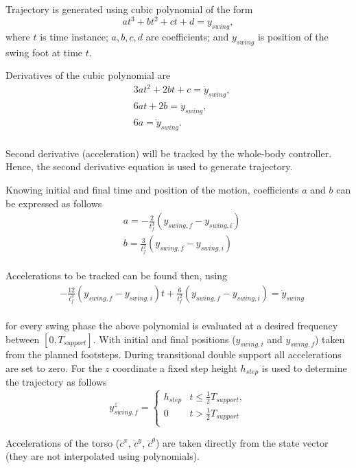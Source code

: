 \documentclass[a4paper]{article}
\begin{document}
Trajectory is generated using cubic polynomial of the form
\begin{equation}
    at^3 + bt^2 + ct + d = y_{swing},
\end{equation}
where $t$ is time instance; $a,b,c,d$ are coefficients; and $y_{swing}$ is position of the swing
foot at time $t$.

\noindent Derivatives of the cubic polynomial are
\begin{equation}
\begin{split}
    & 3at^2 + 2bt + c = \dot{y}_{swing},\\
    & 6at + 2b = \ddot{y}_{swing},\\
    & 6a = \dddot{y}_{swing}.\\
\end{split}
\end{equation}

\noindent Second derivative (acceleration) will be tracked by the whole-body controller. Hence, the second derivative equation is used to generate 
trajectory.

\noindent Knowing initial and final time and position of the motion, coefficients $a$ and $b$ can be expressed as follows
\begin{equation}
\begin{split}
    & a = -\frac{2}{t^{3}_f}(y_{swing,f} - y_{swing,i})\\
    & b = \frac{3}{t^{2}_f}(y_{swing,f} - y_{swing,i})\\
\end{split}
\end{equation}

\noindent Accelerations to be tracked can be found then, using
\begin{equation}
\begin{split}
    & -\frac{12}{t^{3}_f}(y_{swing,f} - y_{swing,i})t + \frac{6}{t^{2}_f}(y_{swing,f} - y_{swing,i}) = \ddot{y}_{swing}\\
\end{split}
\end{equation}

\noindent for every swing phase the above polynomial is evaluated at a desired frequency between $[0, T_{support}]$. With initial and final
positions ($y_{swing, i}$ and $y_{swing, f}$) taken from the planned footsteps. 
During transitional double support all accelerations are set to zero. For the $z$ coordinate a fixed
step height $h_{step}$ is used to determine the trajectory as follows
\begin{equation}
    y_{swing,f}^z = 
    \left\{
        \begin{array}{ll}
            h_{step}    & t \le \frac{1}{2}T_{support}, \\
            0           & t > \frac{1}{2}T_{support}\\
        \end{array}
    \right.
\end{equation}

\noindent Accelerations of the torso ($\ddot{c}^x$, $\ddot{c}^y$, $\ddot{c}^\theta$) are taken directly from the state vector
(they are not interpolated using polynomials).
\end{document}
